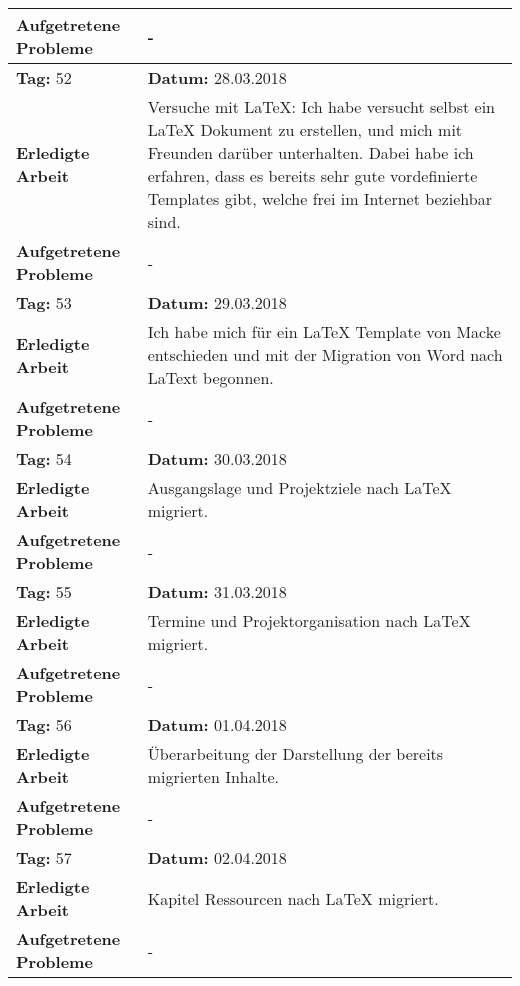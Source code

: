 \begin{longtable}{|p{5cm}|p{5cm}p{6cm}|}
\textbf{Aufgetretene Probleme} & \multicolumn{2}{p{11cm}|}{-} \\ \hline
\rowcolor{heading}\textbf{Tag:} 52 & \textbf{Datum:} 28.03.2018 & \\ \hline
\textbf{Erledigte Arbeit} & \multicolumn{2}{p{11cm}|}{Versuche mit LaTeX: Ich habe versucht selbst ein LaTeX Dokument zu erstellen, und mich mit Freunden darüber unterhalten. Dabei habe ich erfahren, dass es bereits sehr gute vordefinierte Templates gibt, welche frei im Internet beziehbar sind.} \\ \hline
\textbf{Aufgetretene Probleme} & \multicolumn{2}{p{11cm}|}{-} \\ \hline
\rowcolor{heading}\textbf{Tag:} 53 & \textbf{Datum:} 29.03.2018 & \\ \hline
\textbf{Erledigte Arbeit} & \multicolumn{2}{p{11cm}|}{Ich habe mich für ein LaTeX Template von Macke entschieden und mit der Migration von Word nach LaText begonnen.} \\ \hline
\textbf{Aufgetretene Probleme} & \multicolumn{2}{p{11cm}|}{-} \\ \hline
\rowcolor{heading}\textbf{Tag:} 54 & \textbf{Datum:} 30.03.2018 & \\ \hline
\textbf{Erledigte Arbeit} & \multicolumn{2}{p{11cm}|}{Ausgangslage und Projektziele nach LaTeX migriert.} \\ \hline
\textbf{Aufgetretene Probleme} & \multicolumn{2}{p{11cm}|}{-} \\ \hline\rowcolor{heading}\textbf{Tag:} 55 & \textbf{Datum:} 31.03.2018 & \\ \hline
\textbf{Erledigte Arbeit} & \multicolumn{2}{p{11cm}|}{Termine und Projektorganisation nach LaTeX migriert.} \\ \hline
\textbf{Aufgetretene Probleme} & \multicolumn{2}{p{11cm}|}{-} \\ \hline
\rowcolor{heading}\textbf{Tag:} 56 & \textbf{Datum:} 01.04.2018 & \\ \hline
\textbf{Erledigte Arbeit} & \multicolumn{2}{p{11cm}|}{Überarbeitung der Darstellung der bereits migrierten Inhalte.} \\ \hline
\textbf{Aufgetretene Probleme} & \multicolumn{2}{p{11cm}|}{-} \\ \hline
\rowcolor{heading}\textbf{Tag:} 57 & \textbf{Datum:} 02.04.2018 & \\ \hline
\textbf{Erledigte Arbeit} & \multicolumn{2}{p{11cm}|}{Kapitel Ressourcen nach LaTeX migriert.} \\ \hline
\textbf{Aufgetretene Probleme} & \multicolumn{2}{p{11cm}|}{-} \\ \hline

\end{longtable}
